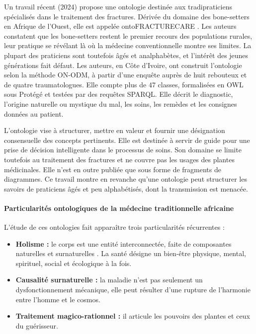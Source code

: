 Un travail récent (2024) propose une ontologie destinée aux tradipraticiens spécialisés dans le traitement des fractures. Dérivée du domaine des bone-setters en Afrique de l'Ouest, elle est appelée ontoFRACTURECARE \cite{diomande_ontofracturecare_2024}. Les auteurs constatent que les bone-setters restent le premier recours des populations rurales, leur pratique se révélant là où la médecine conventionnelle montre ses limites. La plupart des praticiens sont toutefois âgés et analphabètes, et l'intérêt des jeunes générations fait défaut. Les auteurs, en Côte d'Ivoire, ont construit l'ontologie selon la méthode ON-ODM, à partir d'une enquête auprès de huit rebouteux et de quatre traumatologues. Elle compte plus de 47 classes, formalisées en OWL sous Protégé et testées par des requêtes SPARQL. Elle décrit le diagnostic, l'origine naturelle ou mystique du mal, les soins, les remèdes et les consignes données au patient.

L'ontologie vise à structurer, mettre en valeur et fournir une désignation consensuelle des concepts pertinents. Elle est destinée à servir de guide pour une prise de décision intelligente dans le processus de soins. Son domaine se limite toutefois au traitement des fractures et ne couvre pas les usages des plantes médicinales. Elle n'est en outre publiée que sous forme de fragments de diagrammes. Ce travail montre en revanche qu'une ontologie peut structurer les savoirs de praticiens âgés et peu alphabétisés, dont la transmission est menacée.

\paragraph{Particularités ontologiques de la médecine traditionnelle africaine}

L'étude de ces ontologies fait apparaître trois particularités récurrentes :
\begin{itemize}[label={$\bullet$}, leftmargin=1cm]
    \item \textbf{Holisme :} le corps est une entité interconnectée, faite de composantes naturelles et surnaturelles \cite{tosam2024}. La santé désigne un bien-être physique, mental, spirituel, social et écologique à la fois.
    \item \textbf{Causalité surnaturelle :} la maladie n'est pas seulement un dysfonctionnement mécanique, elle peut résulter d'une rupture de l'harmonie entre l'homme et le cosmos.
    \item \textbf{Traitement magico-rationnel :} il articule les pouvoirs des plantes et ceux du guérisseur.
\end{itemize}

